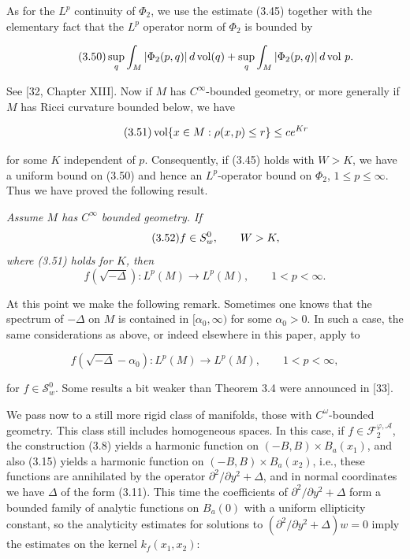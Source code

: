 As for the $L^{p}$ continuity of $\Phi_{2}$, we use the estimate (3.45) together with the elementary fact that the $L^{p}$ operator norm of $\Phi_{2}$ is bounded by

\begin{equation}\tag{3.50}
\sup_{q}\int_{M}|\Phi_{2}(p,q)|\,d\operatorname{vol}(q)+\sup_{q}\int_{M}|\Phi_{2}(p,q)|\,d\operatorname{vol}\,p.
\end{equation}

See [32, Chapter XIII]. Now if $M$ has $C^{\infty}$-bounded geometry, or more generally if $M$ has Ricci curvature bounded below, we have

\begin{equation}\tag{3.51}
\operatorname{vol}\{x\in M:\rho(x,p)\leq r\}\leq ce^{Kr}
\end{equation}

for some $K$ independent of $p$. Consequently, if (3.45) holds with $W>K$, we have a uniform bound on (3.50) and hence an $L^{p}$-operator bound on $\Phi_{2}$, $1\leq p\leq \infty$. Thus we have proved the following result.

\begin{theorem}
\label{thm:lp-continuity-strip-holomorphic-symbols}
\textit{Assume $M$ has $C^{\infty}$ bounded geometry. If}
\begin{equation}\tag{3.52}
f\in S^{0}_{w}, \qquad W>K,
\end{equation}
\textit{where (3.51) holds for $K$, then}
\begin{equation}\tag{3.53}
f(\sqrt{-\Delta}): L^{p}(M)\to L^{p}(M), \qquad 1<p<\infty.
\end{equation}
\end{theorem}

At this point we make the following remark. Sometimes one knows that the spectrum of $-\Delta$ on $M$ is contained in $[\alpha_{0},\infty)$ for some $\alpha_{0}>0$. In such a case, the same considerations as above, or indeed elsewhere in this paper, apply to

\begin{equation}\tag{3.54}
 f(\sqrt{-\Delta}-\alpha_0): L^p(M) \to L^p(M), \qquad 1 < p < \infty,
\end{equation}

for $f\in \mathcal S_w^0$. Some results a bit weaker than Theorem 3.4 were announced in [33].

We pass now to a still more rigid class of manifolds, those with $C^\omega$-bounded geometry. This class still includes homogeneous spaces. In this case, if $f\in \mathcal F_2^{\varphi,\mathcal A}$, the construction (3.8) yields a harmonic function on $(-B,B)\times B_a(x_1)$, and also (3.15) yields a harmonic function on $(-B,B)\times B_a(x_2)$, i.e., these functions are annihilated by the operator $\partial^2/\partial y^2 + \Delta$, and in normal coordinates we have $\Delta$ of the form (3.11). This time the coefficients of $\partial^2/\partial y^2 + \Delta$ form a bounded family of analytic functions on $B_a(0)$ with a uniform ellipticity constant, so the analyticity estimates for solutions to $(\partial^2/\partial y^2 + \Delta)w = 0$ imply the estimates on the kernel $k_f(x_1,x_2)$:

